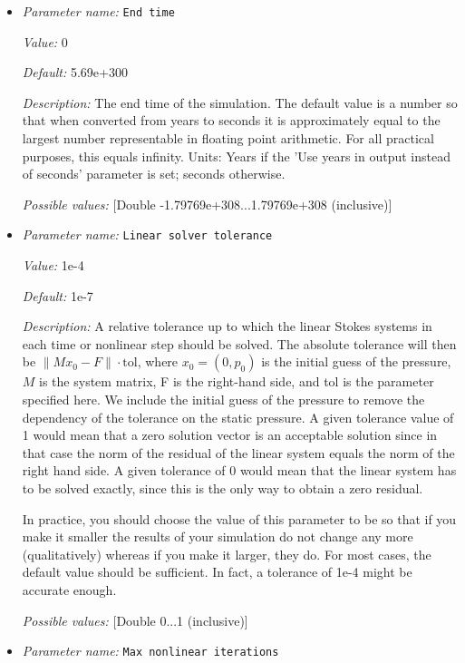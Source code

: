 \begin{itemize}
{\it Possible values:} [Integer range 2...4 (inclusive)]
\item {\it Parameter name:} {\tt End time}
\label{parameters:End time}


{\it Value:} 0


{\it Default:} 5.69e+300


{\it Description:} The end time of the simulation. The default value is a number so that when converted from years to seconds it is approximately equal to the largest number representable in floating point arithmetic. For all practical purposes, this equals infinity. Units: Years if the 'Use years in output instead of seconds' parameter is set; seconds otherwise.


{\it Possible values:} [Double -1.79769e+308...1.79769e+308 (inclusive)]
\item {\it Parameter name:} {\tt Linear solver tolerance}
\label{parameters:Linear solver tolerance}


{\it Value:} 1e-4


{\it Default:} 1e-7


{\it Description:} A relative tolerance up to which the linear Stokes systems in each time or nonlinear step should be solved. The absolute tolerance will then be $\| M x_0 - F \| \cdot \text{tol}$, where $x_0 = (0,p_0)$ is the initial guess of the pressure, $M$ is the system matrix, F is the right-hand side, and tol is the parameter specified here. We include the initial guess of the pressure to remove the dependency of the tolerance on the static pressure. A given tolerance value of 1 would mean that a zero solution vector is an acceptable solution since in that case the norm of the residual of the linear system equals the norm of the right hand side. A given tolerance of 0 would mean that the linear system has to be solved exactly, since this is the only way to obtain a zero residual.

In practice, you should choose the value of this parameter to be so that if you make it smaller the results of your simulation do not change any more (qualitatively) whereas if you make it larger, they do. For most cases, the default value should be sufficient. In fact, a tolerance of 1e-4 might be accurate enough.


{\it Possible values:} [Double 0...1 (inclusive)]
\item {\it Parameter name:} {\tt Max nonlinear iterations}
\label{parameters:Max nonlinear iterations}



\end{itemize}
